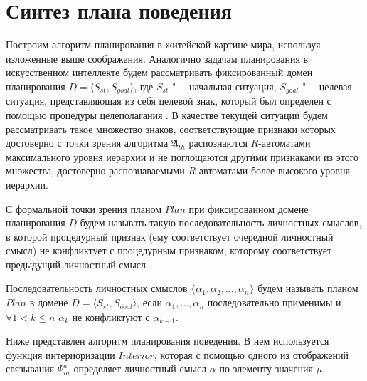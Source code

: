 \documentclass[a4paper, 12pt]{article}
\newcommand{\stretchsize}{2}
\renewcommand{\baselinestretch}{\stretchsize}
\numberwithin{equation}{section}
\begin{document}
	\section{Синтез плана поведения} \label{sect:plan}
	Построим алгоритм планирования в житейской картине мира, используя изложенные выше соображения. Аналогично задачам планирования в искусственном интеллекте \cite{Fikes1971} будем рассматривать фиксированный домен планирования $D=\langle S_{st},S_{goal} \rangle$, где $S_{st}$ "--- начальная ситуация, $S_{goal}$ "--- целевая ситуация, представляющая из себя целевой знак, который был определен с помощью процедуры целеполагания \cite{PanovA2014a}. В качестве текущей ситуации будем рассматривать такое множество знаков, соответствующие признаки которых достоверно с точки зрения алгоритма $\mathfrak A_{th}$ распознаются $R$-автоматами максимального уровня иерархии и не поглощаются другими признаками из этого множества, достоверно распознаваемыми $R$-автоматами более высокого уровня иерархии.
	
	С формальной точки зрения планом $Plan$ при фиксированном домене планирования $D$ будем называть такую последовательность личностных смыслов, в которой процедурный признак (ему соответствует очередной личностный смысл) не конфликтует с процедурным признаком, которому соответствует предыдущий личностный смысл.
	
		Последовательность личностных смыслов $\{\alpha_1,\alpha_2,\dots,\alpha_n\}$ будем называть планом $Plan$ в домене $D=\langle S_{st},S_{goal} \rangle$, если $\alpha_1,\dots,\alpha_n$ последовательно применимы и $\forall 1<k\leqslant n$ $\alpha_k$ не конфликтуют с $\alpha_{k-1}$.

	Ниже представлен алгоритм планирования поведения. В нем используется функция интериоризации $Interior$, которая с помощью одного из отображений связывания $\Psi_m^a$ \cite{PanovA2014a} определяет личностный смысл $\alpha$ по элементу значения $\mu$.
	
	\renewcommand{\baselinestretch}{1}
	\begin{algorithm}[H]
		\begin{algorithmic}[1]
			
		\end{algorithmic}
	\end{algorithm}
	\renewcommand{\baselinestretch}{\stretchsize}
		
\end{document}
